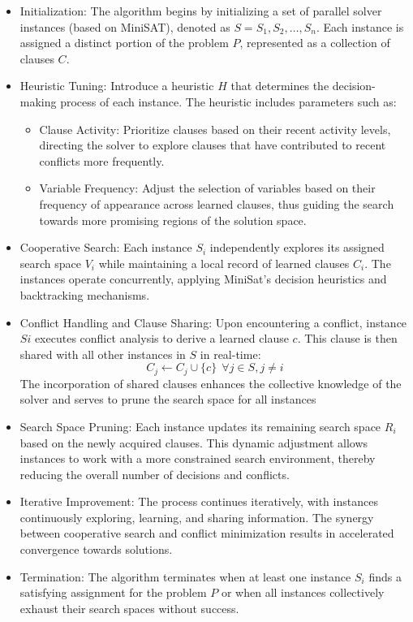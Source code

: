 \documentclass{article}
\begin{document}
\begin{itemize}
    \item Initialization: The algorithm begins by initializing a set of parallel solver instances (based on MiniSAT), denoted as $S = {S_1,S_2,…,S_n}$. Each instance is assigned a distinct portion of the problem $P$, represented as a collection of clauses $C$.
    \item Heuristic Tuning: Introduce a heuristic $H$ that determines the decision-making process of each instance. The heuristic includes parameters such as:
    \begin{itemize}
        \item Clause Activity: Prioritize clauses based on their recent activity levels, directing the solver to explore clauses that have contributed to recent conflicts more frequently.
        \item Variable Frequency: Adjust the selection of variables based on their frequency of appearance across learned clauses, thus guiding the search towards more promising regions of the solution space.
    \end{itemize}
    \item Cooperative Search: Each instance $S_i$ independently explores its assigned search space $V_i$ while maintaining a local record of learned clauses $C_i$. The instances operate concurrently, applying MiniSat's decision heuristics and backtracking mechanisms.
    \item Conflict Handling and Clause Sharing: Upon encountering a conflict, instance $Si$ executes conflict analysis to derive a learned clause $c$. This clause is then shared with all other instances in $S$ in real-time:
    $$C_j \leftarrow C_j \cup \{ c \}\ \ \forall j \in S, j \neq i$$
    The incorporation of shared clauses enhances the collective knowledge of the solver and serves to prune the search space for all instances
    \item Search Space Pruning: Each instance updates its remaining search space $R_i$ based on the newly acquired clauses. This dynamic adjustment allows instances to work with a more constrained search environment, thereby reducing the overall number of decisions and conflicts.

    \item Iterative Improvement: The process continues iteratively, with instances continuously exploring, learning, and sharing information. The synergy between cooperative search and conflict minimization results in accelerated convergence towards solutions.

    \item Termination: The algorithm terminates when at least one instance $S_i$ finds a satisfying assignment for the problem $P$ or when all instances collectively exhaust their search spaces without success.
\end{itemize}
\end{document}
